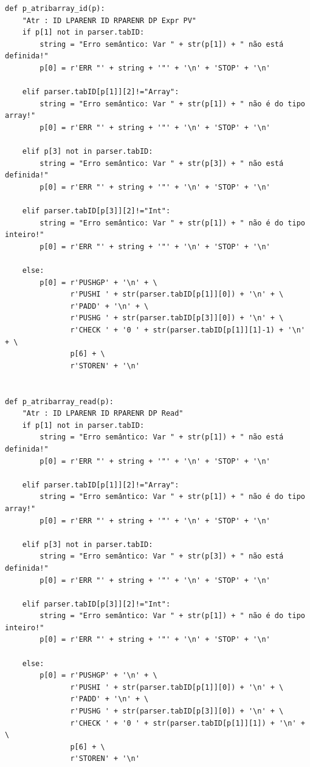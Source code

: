\documentclass{article}
\begin{document}
\begin{lstlisting}[firstnumber=234]
def p_atribarray_id(p):
    "Atr : ID LPARENR ID RPARENR DP Expr PV"
    if p[1] not in parser.tabID:
        string = "Erro semântico: Var " + str(p[1]) + " não está definida!"
        p[0] = r'ERR "' + string + '"' + '\n' + 'STOP' + '\n'

    elif parser.tabID[p[1]][2]!="Array":
        string = "Erro semântico: Var " + str(p[1]) + " não é do tipo array!"
        p[0] = r'ERR "' + string + '"' + '\n' + 'STOP' + '\n'

    elif p[3] not in parser.tabID:
        string = "Erro semântico: Var " + str(p[3]) + " não está definida!"
        p[0] = r'ERR "' + string + '"' + '\n' + 'STOP' + '\n'

    elif parser.tabID[p[3]][2]!="Int":
        string = "Erro semântico: Var " + str(p[1]) + " não é do tipo inteiro!"
        p[0] = r'ERR "' + string + '"' + '\n' + 'STOP' + '\n'

    else:
        p[0] = r'PUSHGP' + '\n' + \
               r'PUSHI ' + str(parser.tabID[p[1]][0]) + '\n' + \
               r'PADD' + '\n' + \
               r'PUSHG ' + str(parser.tabID[p[3]][0]) + '\n' + \
               r'CHECK ' + '0 ' + str(parser.tabID[p[1]][1]-1) + '\n' + \
               p[6] + \
               r'STOREN' + '\n'


def p_atribarray_read(p):
    "Atr : ID LPARENR ID RPARENR DP Read"
    if p[1] not in parser.tabID:
        string = "Erro semântico: Var " + str(p[1]) + " não está definida!"
        p[0] = r'ERR "' + string + '"' + '\n' + 'STOP' + '\n'

    elif parser.tabID[p[1]][2]!="Array":
        string = "Erro semântico: Var " + str(p[1]) + " não é do tipo array!"
        p[0] = r'ERR "' + string + '"' + '\n' + 'STOP' + '\n'

    elif p[3] not in parser.tabID:
        string = "Erro semântico: Var " + str(p[3]) + " não está definida!"
        p[0] = r'ERR "' + string + '"' + '\n' + 'STOP' + '\n'

    elif parser.tabID[p[3]][2]!="Int":
        string = "Erro semântico: Var " + str(p[1]) + " não é do tipo inteiro!"
        p[0] = r'ERR "' + string + '"' + '\n' + 'STOP' + '\n'

    else:
        p[0] = r'PUSHGP' + '\n' + \
               r'PUSHI ' + str(parser.tabID[p[1]][0]) + '\n' + \
               r'PADD' + '\n' + \
               r'PUSHG ' + str(parser.tabID[p[3]][0]) + '\n' + \
               r'CHECK ' + '0 ' + str(parser.tabID[p[1]][1]) + '\n' + \
               p[6] + \
               r'STOREN' + '\n'
\end{lstlisting}
\end{document}
